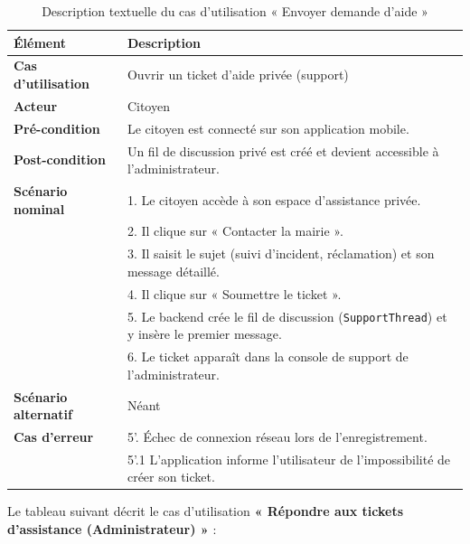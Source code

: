 \begin{table}[H]
    \centering
    \caption{Description textuelle du cas d'utilisation « Envoyer demande d’aide »}
    \label{tab:txt_ouvrir_ticket}
    \vspace{0.2cm}
    \small
    \begin{tabularx}{\textwidth}{|l|X|}
        \hline
        \textbf{Élément} & \textbf{Description} \\ \hline
        \textbf{Cas d’utilisation} & Ouvrir un ticket d'aide privée (support) \\ \hline
        \textbf{Acteur} & Citoyen \\ \hline
        \textbf{Pré-condition} & Le citoyen est connecté sur son application mobile. \\ \hline
        \textbf{Post-condition} & Un fil de discussion privé est créé et devient accessible à l'administrateur. \\ \hline
        \textbf{Scénario nominal} &
        1. Le citoyen accède à son espace d'assistance privée.\\
        & 2. Il clique sur « Contacter la mairie ».\\
        & 3. Il saisit le sujet (suivi d'incident, réclamation) et son message détaillé.\\
        & 4. Il clique sur « Soumettre le ticket ».\\
        & 5. Le backend crée le fil de discussion (\texttt{SupportThread}) et y insère le premier message.\\
        & 6. Le ticket apparaît dans la console de support de l'administrateur. \\ \hline
        \textbf{Scénario alternatif} & Néant \\ \hline
        \textbf{Cas d’erreur} &
        5'. Échec de connexion réseau lors de l'enregistrement.\\
        & 5'.1 L'application informe l'utilisateur de l'impossibilité de créer son ticket. \\ \hline
    \end{tabularx}
\end{table}

Le tableau suivant décrit le cas d'utilisation \textbf{« Répondre aux tickets d'assistance (Administrateur) »} :

